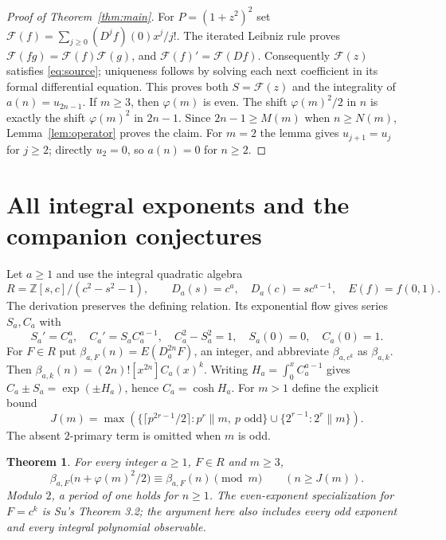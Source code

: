 \documentclass[11pt]{article}
\newtheorem{theorem}{Theorem}
\newcommand{\Z}{\mathbb Z}
\newcommand{\ph}{\varphi}
\begin{document}
\begin{proof}[Proof of Theorem~\ref{thm:main}]
For $P=(1+z^2)^2$ set
$\mathcal F(f)=\sum_{j\ge0}(D^jf)(0)x^j/j!$.
The iterated Leibniz rule proves
$\mathcal F(fg)=\mathcal F(f)\mathcal F(g)$, and
$\mathcal F(f)'=\mathcal F(Df)$.
Consequently $\mathcal F(z)$ satisfies \eqref{eq:source};
uniqueness follows by solving each next coefficient in its
formal differential equation. This proves both
$S=\mathcal F(z)$ and the integrality of $a(n)=u_{2n-1}$.
If $m\ge3$, then $\ph(m)$ is even. The shift $\ph(m)^2/2$
in $n$ is exactly the shift $\ph(m)^2$ in $2n-1$.
Since $2n-1\ge M(m)$ when $n\ge N(m)$,
Lemma~\ref{lem:operator} proves the claim. For $m=2$ the lemma
gives $u_{j+1}=u_j$ for $j\ge2$; directly $u_2=0$,
so $a(n)=0$ for $n\ge2$.
\end{proof}

\section{All integral exponents and the companion conjectures}
Let $a\ge1$ and use the integral quadratic algebra
\[
 R=\Z[s,c]/(c^2-s^2-1),\qquad
 D_a(s)=c^a,\quad D_a(c)=sc^{a-1},\quad E(f)=f(0,1).
\]
The derivation preserves the defining relation. Its exponential
flow gives series $S_a,C_a$ with
\[
 S_a'=C_a^a,\quad C_a'=S_aC_a^{a-1},\quad
 C_a^2-S_a^2=1,\quad S_a(0)=0,\quad C_a(0)=1.
\]
For $F\in R$ put $\beta_{a,F}(n)=E(D_a^{2n}F)$, an integer, and
abbreviate $\beta_{a,c^k}$ as $\beta_{a,k}$.
Then $\beta_{a,k}(n)=(2n)![x^{2n}]C_a(x)^k$.
Writing $H_a=\int_0^x C_a^{a-1}$ gives
$C_a\pm S_a=\exp(\pm H_a)$, hence $C_a=\cosh H_a$.
For $m>1$ define the explicit bound
\[
 J(m)=\max\left(\{\lceil p^{2r-1}/2\rceil:
 p^r\parallel m,\ p\text{ odd}\}\cup
 \{2^{r-1}:2^r\parallel m\}\right).
\]
The absent $2$-primary term is omitted when $m$ is odd.

\begin{theorem}\label{thm:allpowers}
For every integer $a\ge1$, $F\in R$ and $m\ge3$,
\[
 \beta_{a,F}\bigl(n+\ph(m)^2/2\bigr)
 \equiv\beta_{a,F}(n)\pmod m\qquad(n\ge J(m)).
\]
Modulo $2$, a period of one holds for $n\ge1$.
The even-exponent specialization for $F=c^k$ is Su's
Theorem 3.2; the argument here also includes every odd exponent
and every integral polynomial observable.
\end{theorem}
\end{document}
